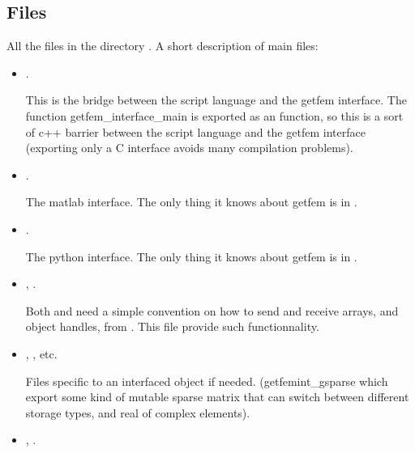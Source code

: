 \documentclass[a4paper,11pt,english]{sphinxmanual}
\begin{document}
\subsection{Files}
\label{\detokenize{project/libdesc_interface:files}}
All the files in the directory . A short description of main files:
\begin{itemize}
\item {} 
.

This is the bridge between the script language and the getfem interface. The
function getfem\_interface\_main is exported as an  function, so
this is a sort of c++ barrier between the script language and the getfem
interface (exporting only a C interface avoids many compilation problems).

\item {} 
.

The matlab interface. The only thing it knows about getfem is in
.

\item {} 
.

The python interface. The only thing it knows about getfem is in
.

\item {} 
, .

Both  and  need a simple convention on
how to send and receive arrays, and object handles, from
. This file provide such functionnality.

\item {} 
, , etc.

Files specific to an interfaced object if needed.
(getfemint\_gsparse which export some kind of mutable sparse matrix that can
switch between different storage types, and real of complex elements).

\item {} 
, .


\end{itemize}
\end{document}

